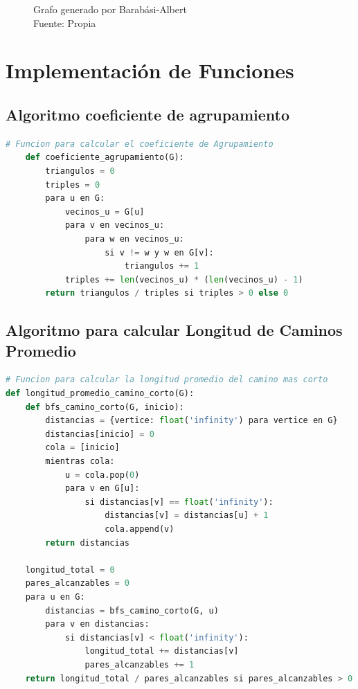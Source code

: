 \begin{figure}[h]
\caption{Grafo generado por Barabási-Albert\\Fuente: Propia}
\end{figure}

\section{Implementación de Funciones}

\subsection{Algoritmo coeficiente de agrupamiento}
\begin{lstlisting}[language=Python]
    # Funcion para calcular el coeficiente de Agrupamiento
    def coeficiente_agrupamiento(G):
        triangulos = 0
        triples = 0
        para u en G:
            vecinos_u = G[u]
            para v en vecinos_u:
                para w en vecinos_u:
                    si v != w y w en G[v]:
                        triangulos += 1
            triples += len(vecinos_u) * (len(vecinos_u) - 1)
        return triangulos / triples si triples > 0 else 0
\end{lstlisting}

\subsection{Algoritmo para calcular Longitud de Caminos Promedio}

\begin{lstlisting}[language=Python]
# Funcion para calcular la longitud promedio del camino mas corto
def longitud_promedio_camino_corto(G):
    def bfs_camino_corto(G, inicio):
        distancias = {vertice: float('infinity') para vertice en G}
        distancias[inicio] = 0
        cola = [inicio]
        mientras cola:
            u = cola.pop(0)
            para v en G[u]:
                si distancias[v] == float('infinity'):
                    distancias[v] = distancias[u] + 1
                    cola.append(v)
        return distancias

    longitud_total = 0
    pares_alcanzables = 0
    para u en G:
        distancias = bfs_camino_corto(G, u)
        para v en distancias:
            si distancias[v] < float('infinity'):
                longitud_total += distancias[v]
                pares_alcanzables += 1
    return longitud_total / pares_alcanzables si pares_alcanzables > 0 else float('infinity')
\end{lstlisting}

